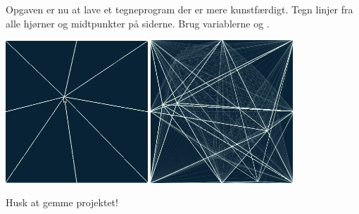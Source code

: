 \documentclass{ucph-handout}
\begin{document}
\begin{exercisebox}[adjusted title=Nyt projekt: Kreativt tegneprogram ]
Opgaven er nu at lave et tegneprogram der er mere kunstfærdigt. Tegn
linjer fra alle hjørner og midtpunkter på siderne. Brug
variablerne  og .
\begin{center}
  \includegraphics[width=0.40\textwidth]{illustrationer/kryds.png}
  \quad
  \includegraphics[width=0.40\textwidth]{illustrationer/kryds-tegning.png}
\end{center}
Husk at gemme projektet!
\end{exercisebox}
\end{document}
